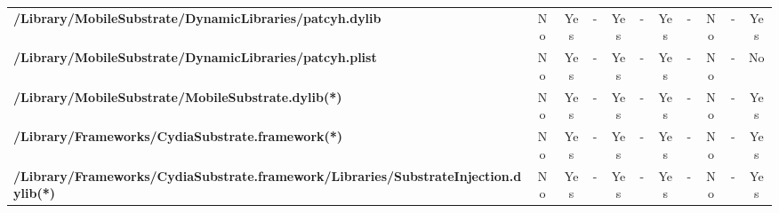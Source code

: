 \begin{center}
{\begin{tabular}{|>{\bfseries} l | C | C | C | C | C | C | C | C | C | C |}
					/Library/MobileSubstrate/DynamicLibraries/patcyh.dylib & \color{green}No & \color{red}Yes & - & Yes & - & Yes & - & No & - & Yes\\ 
					/Library/MobileSubstrate/DynamicLibraries/patcyh.plist & \color{green}No & \color{red}Yes & - & Yes & - & Yes & - & No & - & No\\ 
					/Library/MobileSubstrate/MobileSubstrate.dylib(*) & \color{green}No & \color{red}Yes & - & Yes & - & Yes & - & No & - & Yes\\ 
					/Library/Frameworks/CydiaSubstrate.framework(*) & \color{green}No & \color{red}Yes & - & Yes & - & Yes & - & No & - & Yes\\ 
					/Library/Frameworks/CydiaSubstrate.framework/Libraries/SubstrateInjection.dylib(*) & \color{green}No & \color{red}Yes & - & Yes & - & Yes & - & No & - & Yes\\ 

			\end{tabular}
		}
	\end{center}



